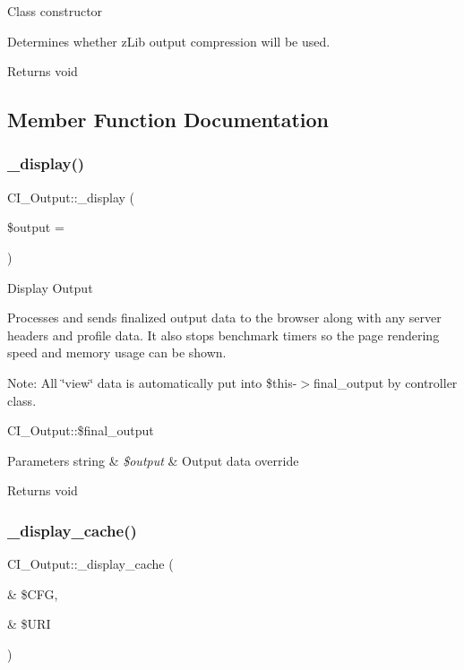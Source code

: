 Class constructor

Determines whether z\+Lib output compression will be used.

\begin{DoxyReturn}{Returns}
void 
\end{DoxyReturn}


\subsection{Member Function Documentation}
\mbox{\label{class_c_i___output_a400d71167163b629d99d506d39402fd6}} 
\subsubsection{\texorpdfstring{\+\_\+display()}{\_display()}}
{\footnotesize\ttfamily C\+I\+\_\+\+Output\+::\+\_\+display (\begin{DoxyParamCaption}\item[{}]{\$output = {\ttfamily \textquotesingle{}\textquotesingle{}} }\end{DoxyParamCaption})}

Display Output

Processes and sends finalized output data to the browser along with any server headers and profile data. It also stops benchmark timers so the page rendering speed and memory usage can be shown.

Note\+: All \char`\"{}view\char`\"{} data is automatically put into \$this-\/$>$final\+\_\+output by controller class.

C\+I\+\_\+\+Output\+::\$final\+\_\+output 
\begin{DoxyParams}[1]{Parameters}
string & {\em \$output} & Output data override \\
\hline
\end{DoxyParams}
\begin{DoxyReturn}{Returns}
void 
\end{DoxyReturn}
\mbox{\label{class_c_i___output_af61960a85a64fe08897bd015fe40f403}} 
\subsubsection{\texorpdfstring{\+\_\+display\+\_\+cache()}{\_display\_cache()}}
{\footnotesize\ttfamily C\+I\+\_\+\+Output\+::\+\_\+display\+\_\+cache (\begin{DoxyParamCaption}\item[{\&}]{\$\+C\+FG,  }\item[{\&}]{\$\+U\+RI }\end{DoxyParamCaption})}

